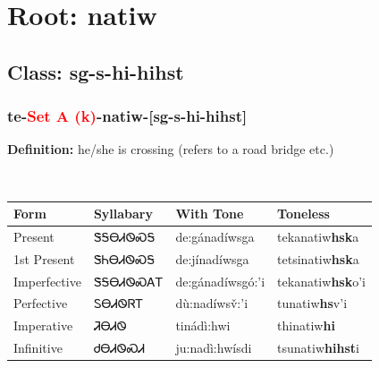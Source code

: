 \needspace{4in}
\section*{Root: natiw}
\nopagebreak
{}
\needspace{3in}
\subsection*{Class: sg-s-hi-hihst}
\nopagebreak
\needspace{2in}
\subsubsection*{te{-}\textcolor{Red}{Set A (k)}{-}\textbf{natiw}{-}[sg-s-hi-hihst]}
\nopagebreak
\textbf{Definition: } he/she is crossing (refers to a road{\quotesinglbase} bridge{\quotesinglbase} etc.)
\\[0.5em]
\begin{tabularx}{\textwidth}{l X X X}%
\toprule%
\textbf{Form}&\textbf{Syllabary}&\textbf{With Tone}&\textbf{Toneless}\\%
\midrule%
Present&ᏕᎦᎾᏗᏫᏍᎦ&de:gánadíwsga&tekanatiw\textbf{hsk}a\\%
1st Present&ᏕᏂᎾᏗᏫᏍᎦ&de:jínadíwsga&tetsinatiw\textbf{hsk}a\\%
Imperfective&ᏕᎦᎾᏗᏫᏍᎪᎢ&de:gánadíwsgó:’i&tekanatiw\textbf{hsk}o'i\\%
Perfective&ᏚᎾᏗᏫᏒᎢ&dù:nadíwsv̌:’i&tunatiw\textbf{hs}v'i\\%
Imperative&ᏘᎾᏗᏫ&tinádì:hwi&thinatiw\textbf{hi}\\%
Infinitive&ᏧᎾᏗᏫᏍᏗ&ju:nadì:hwísdi&tsunatiw\textbf{hihst}i\\%
\bottomrule%
\end{tabularx}
\\[1em]